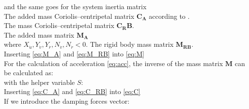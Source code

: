\begin{equation}
    \label{eq:C}
    
\end{equation}
and the same goes for the system inertia matrix
\begin{equation}
    \label{eq:M}
    
\end{equation}
The added mass Coriolis–centripetal matrix $\mathbf{C_A}$ according to \citep{imlayCOMPLETEEXPRESSIONSADDED1961}.
\begin{equation}
    \label{eq:C_A}
    
\end{equation}
The mass Coriolis–centripetal matrix $\mathbf{C_RB}$.
\begin{equation}
    \label{eq:C_RB}
    
\end{equation}
The added mass matrix $\mathbf{M_A}$
\begin{equation}
    \label{eq:M_A}
    
\end{equation}
where $X_{\dot{u}},Y_{\dot{v}},Y_{\dot{r}},N_{\dot{v}},N_{\dot{r}} < 0$. 
The rigid body mass matrix $\mathbf{M_{RB}}$.
\begin{equation}
    \label{eq:M_RB}
    
\end{equation}
Inserting \autoref{eq:M_A} and \autoref{eq:M_RB} into \autoref{eq:M}
\begin{equation}
    \label{eq:M_expanded}
    
\end{equation}
For the calculation of acceleration \autoref{eq:acc}, the inverse of the mass matrix $\mathbf{M}$ can be calculated as:
\begin{equation}
    \label{eq:M_inv}
    
\end{equation}
with the helper variable $S$:
\begin{equation}
    \label{eq:S}
    
\end{equation}
Inserting \autoref{eq:C_A} and \autoref{eq:C_RB} into \autoref{eq:C}
\begin{equation}
    \label{eq:C_expanded}
    
\end{equation}
If we introduce the damping forces vector:
\begin{equation}
    \label{eq:D}
    
\end{equation}
